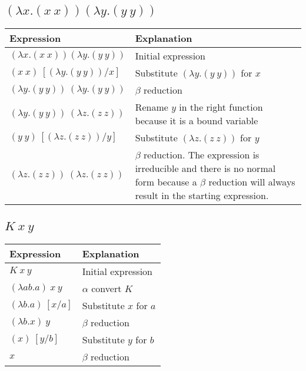 \documentclass[letterpaper, 10pt, DIV=13]{scrartcl}
\numberwithin{equation}{section}
\numberwithin{figure}{section}
\numberwithin{table}{section}
\begin{document}
\subsection{$(\lambda x.(x~x))(\lambda y.(y~y))$}
\begin{center}
\begin{tabularx}{\textwidth}{|Y|Y|}
    \hline
    Expression & Explanation \\
    \hline
    $(\lambda x.(x~x))(\lambda y.(y~y))$ & Initial expression \\
    \hline
    $(x~x)~[(\lambda y.(y~y)) / x]$ & Substitute $(\lambda y.(y~y))$ for $x$ \\
    \hline
    $(\lambda y.(y~y))~(\lambda y.(y~y))$ & $\beta$ reduction \\
    \hline
    $(\lambda y.(y~y))~(\lambda z.(z~z))$ & Rename $y$ in the right function because it is a bound variable \\
    \hline
    $(y~y)~[(\lambda z.(z~z)) / y]$ & Substitute $(\lambda z.(z~z))$ for $y$ \\
    \hline
    $(\lambda z.(z~z))~(\lambda z.(z~z))$ & $\beta$ reduction. The expression is irreducible and there is no normal form because a $\beta$
    reduction will always result in the starting expression. \\
    \hline
\end{tabularx}
\end{center}

\subsection{$K~x~y$}
\begin{center}
\begin{tabularx}{\textwidth}{|Y|Y|}
    \hline
    Expression & Explanation \\
    \hline
    $K~x~y$ & Initial expression \\
    \hline
    $(\lambda ab.a)~x~y$ & $\alpha$ convert $K$ \\
    \hline
    $(\lambda b.a)~[x / a]$ & Substitute $x$ for $a$ \\
    \hline
    $(\lambda b.x)~y$ & $\beta$ reduction \\
    \hline
    $(x)~[y / b]$ & Substitute $y$ for $b$ \\
    \hline
    $x$ & $\beta$ reduction \\
    \hline
\end{tabularx}
\end{center}
\end{document}
